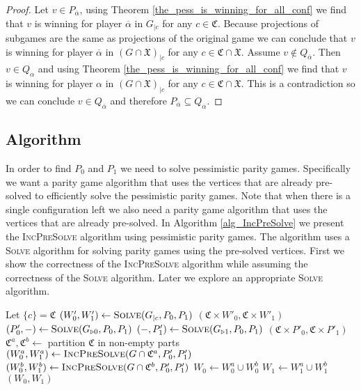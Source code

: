 \begin{lemma}
\begin{proof}
		
		Let $v \in P_{\overline{\alpha}}$, using Theorem \ref{the_pess_is_winning_for_all_conf} we find that $v$ is winning for player $\overline{\alpha}$ in $G_{|c}$ for any $c \in \mathfrak{C}$. Because projections of subgames are the same as projections of the original game we can conclude that $v$ is winning for player $\overline{\alpha}$ in $(G \cap \mathfrak{X})_{|c}$ for any $c \in \mathfrak{C} \cap \mathfrak{X}$.	Assume $v \notin Q_{\overline{\alpha}}$. Then $v \in Q_{\alpha}$ and using Theorem \ref{the_pess_is_winning_for_all_conf} we find that $v$ is winning for player $\alpha$ in $(G \cap \mathfrak{X})_{|c}$ for any $c \in \mathfrak{C} \cap \mathfrak{X}$. This is a contradiction so we can conclude $v \in Q_{\overline{\alpha}}$ and therefore $P_{\overline{\alpha}} \subseteq Q_{\overline{\alpha}}$.
	\end{proof}
\end{lemma}
\subsection{Algorithm}
In order to find $P_0$ and $P_1$ we need to solve pessimistic parity games. Specifically we want a parity game algorithm that uses the vertices that are already pre-solved to efficiently solve the pessimistic parity games. Note that when there is a single configuration left we also need a parity game algorithm that uses the vertices that are already pre-solved. In Algorithm \ref{alg_IncPreSolve} we present the \textsc{IncPreSolve} algorithm using pessimistic parity games. The algorithm uses a \textsc{Solve} algorithm for solving parity games using the pre-solved vertices. First we show the correctness of the \textsc{IncPreSolve} algorithm while assuming the correctness of the \textsc{Solve} algorithm. Later we explore an appropriate \textsc{Solve} algorithm.
\begin{algorithm}
	\caption{$\textsc{IncPreSolve}(G = (V,V_0,V_1, E, \Omega, \mathfrak{C}, \theta), P_0,P_1)$}\label{alg_IncPreSolve}
	\begin{algorithmic}[1]
		\State Let $\{c\} = \mathfrak{C}$
		\State $(W'_0,W'_1) \gets \textsc{Solve}(G_{|c}, P_0,P_1)$
		\State \Return $(\mathfrak{C} \times W'_0, \mathfrak{C} \times W'_1)$
		\EndIf
		\State $(P'_0,-) \gets \textsc{Solve}(G_{\triangleright0}, P_0, P_1)$
		\State $(-,P'_1) \gets \textsc{Solve}(G_{\triangleright1}, P_0, P_1)$
		\State \Return $(\mathfrak{C} \times P'_0, \mathfrak{C} \times P'_1)$
		\EndIf
		\State $\mathfrak{C}^a, \mathfrak{C}^b \gets $ partition $\mathfrak{C}$ in non-empty parts
		\State $(W_0^a, W_1^a) \gets \textsc{IncPreSolve}(G \cap \mathfrak{C}^a, P'_0,P'_1)$
		\State $(W_0^b, W_1^b) \gets \textsc{IncPreSolve}(G \cap \mathfrak{C}^b, P'_0,P'_1)$
		\State $W_0 \gets W_0^a \cup W_0^b$
		\State $W_1 \gets W_1^a \cup W_1^b$
		\State \Return $(W_0,W_1)$
	\end{algorithmic}
\end{algorithm}

